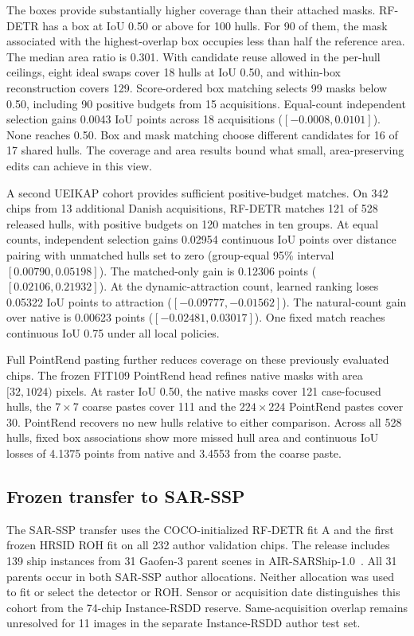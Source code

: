 \documentclass[journal]{IEEEtran}
\begin{document}
The boxes provide substantially higher coverage than their attached masks. RF-DETR has a box at IoU 0.50 or above for 100 hulls. For 90 of them, the mask associated with the highest-overlap box occupies less than half the reference area. The median area ratio is 0.301. With candidate reuse allowed in the per-hull ceilings, eight ideal swaps cover 18 hulls at IoU 0.50, and within-box reconstruction covers 129. Score-ordered box matching selects 99 masks below 0.50, including 90 positive budgets from 15 acquisitions. Equal-count independent selection gains 0.0043 IoU points across 18 acquisitions (\([-0.0008,0.0101]\)). None reaches 0.50. Box and mask matching choose different candidates for 16 of 17 shared hulls. The coverage and area results bound what small, area-preserving edits can achieve in this view.

A second UEIKAP cohort provides sufficient positive-budget matches. On 342 chips from 13 additional Danish acquisitions, RF-DETR matches 121 of 528 released hulls, with positive budgets on 120 matches in ten groups. At equal counts, independent selection gains 0.02954 continuous IoU points over distance pairing with unmatched hulls set to zero (group-equal 95\% interval \([0.00790,0.05198]\)). The matched-only gain is 0.12306 points (\([0.02106,0.21932]\)). At the dynamic-attraction count, learned ranking loses 0.05322 IoU points to attraction (\([-0.09777,-0.01562]\)). The natural-count gain over native is 0.00623 points (\([-0.02481,0.03017]\)). One fixed match reaches continuous IoU 0.75 under all local policies.

Full PointRend pasting further reduces coverage on these previously evaluated chips. The frozen FIT109 PointRend head refines native masks with area \([32,1024)\) pixels. At raster IoU 0.50, the native masks cover 121 case-focused hulls, the \(7{\times}7\) coarse pastes cover 111 and the \(224{\times}224\) PointRend pastes cover 30. PointRend recovers no new hulls relative to either comparison. Across all 528 hulls, fixed box associations show more missed hull area and continuous IoU losses of 4.1375 points from native and 3.4553 from the coarse paste.

\subsection{Frozen transfer to SAR-SSP}
\label{sec:sar-ssp}
The SAR-SSP transfer uses the COCO-initialized RF-DETR fit A and the first frozen HRSID ROH fit on all 232 author validation chips. The release includes 139 ship instances from 31 Gaofen-3 parent scenes in AIR-SARShip-1.0~\cite{slgsea,airsarship}. All 31 parents occur in both SAR-SSP author allocations. Neither allocation was used to fit or select the detector or ROH. Sensor or acquisition date distinguishes this cohort from the 74-chip Instance-RSDD reserve. Same-acquisition overlap remains unresolved for 11 images in the separate Instance-RSDD author test set.
\end{document}
